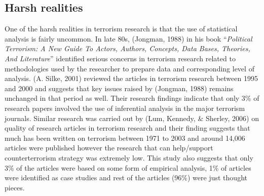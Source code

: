 \documentclass[11pt,oneside,a4paper]{reedthesis}
\begin{document}
\subsection{Harsh realities}\label{harsh-realities}

One of the harsh realities in terrorism research is that the use of
statistical analysis is fairly uncommon. In late 80s, (Jongman, 1988) in
his book ``\emph{Political Terrorism: A New Guide To Actors, Authors,
Concepts, Data Bases, Theories, And Literature}'' identified serious
concerns in terrorism research related to methodologies used by the
researcher to prepare data and corresponding level of analysis. (A.
Silke, 2001) reviewed the articles in terrorism research between 1995
and 2000 and suggests that key issues raised by (Jongman, 1988) remains
unchanged in that period as well. Their research findings indicate that
only 3\% of research papers involved the use of inferential analysis in
the major terrorism journals. Similar research was carried out by (Lum,
Kennedy, \& Sherley, 2006) on quality of research articles in terrorism
research and their finding suggests that much has been written on
terrorism between 1971 to 2003 and around 14,006 articles were published
however the research that can help/support counterterrorism strategy was
extremely low. This study also suggests that only 3\% of the articles
were based on some form of empirical analysis, 1\% of articles were
identified as case studies and rest of the articles (96\%) were just
thought pieces.
\end{document}
